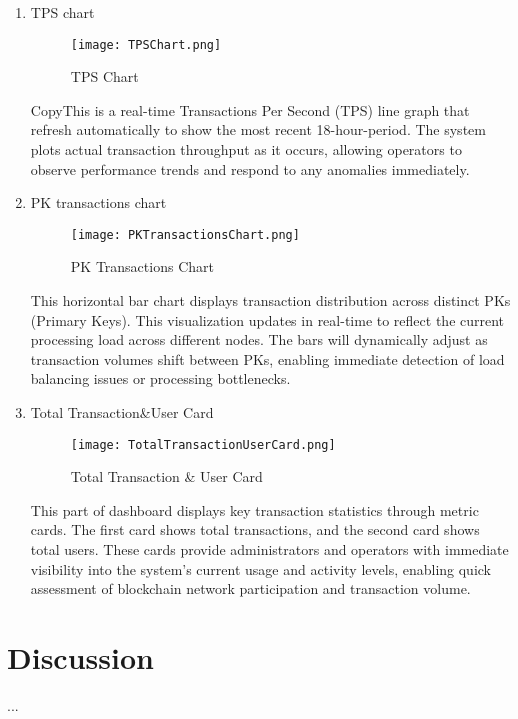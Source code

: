 \documentclass[conference]{IEEEtran}
\begin{document}
\begin{enumerate}[itemsep=2ex, parsep=1ex]
	\item TPS chart
	      	      
	      \begin{figure}[h!]
	      	\centering
	      	\texttt{[image: TPSChart.png]}
	      	\caption{TPS Chart}
	      	\label{fig:TPSChart}
	      \end{figure}
	      	      
	      CopyThis is a real-time Transactions Per Second (TPS) line graph that refresh automatically to show the most recent 18-hour-period. The system plots actual transaction throughput as it occurs, allowing operators to observe performance trends and respond to any anomalies immediately.
	      	      
	\item PK transactions chart
	      	      
	      \begin{figure}[h!]
	      	\centering
	      	\texttt{[image: PKTransactionsChart.png]}
	      	\caption{PK Transactions Chart}
	      	\label{fig:PKTransactionsChart}
	      \end{figure}
	      	      
	      This horizontal bar chart displays transaction distribution across distinct PKs (Primary Keys). This visualization updates in real-time to reflect the current processing load across different nodes. The bars will dynamically adjust as transaction volumes shift between PKs, enabling immediate detection of load balancing issues or processing bottlenecks.
	      	      
	\item Total Transaction\&User Card
	      	      
	      \begin{figure}[h!]
	      	\centering
	      	\texttt{[image: TotalTransactionUserCard.png]}
	      	\caption{Total Transaction \& User Card}
	      	\label{fig:TotalTransactionUserCard}
	      \end{figure}
	      	      
	      This part of dashboard displays key transaction statistics through metric cards. The first card shows total transactions, and the second card shows total users. These cards provide administrators and operators with immediate visibility into the system's current usage and activity levels, enabling quick assessment of blockchain network participation and transaction volume.
\end{enumerate}

\section{Discussion}
    
...
    
\end{document}
